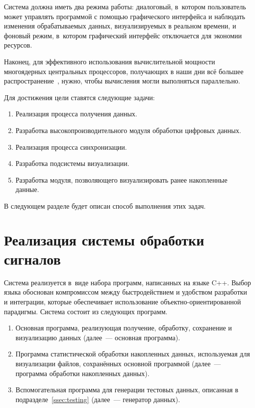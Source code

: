 \documentclass[a4paper, 14pt]{extarticle}
\begin{document}
  Система должна иметь два режима работы: диалоговый, в~котором пользователь может управлять
  программой с помощью графического интерфейса и наблюдать изменения обрабатываемых данных,
  визуализируемых в реальном времени, и фоновый режим, в~котором графический интерфейс отключается
  для экономии ресурсов.

  Наконец, для эффективного использования вычислительной мощности многоядерных центральных
  процессоров, получающих в наши дни всё большее распространение~\cite{steam-hardware}, нужно, чтобы
  вычисления могли выполняться параллельно.

  Для достижения цели ставятся следующие задачи:
  \begin{enumerate}
    \item Реализация процесса получения данных.
    \item Разработка высокопроизводительного модуля обработки цифровых данных.
    \item Реализация процесса синхронизации.
    \item Разработка подсистемы визуализации.
    \item Разработка модуля, позволяющего визуализировать ранее накопленные данные.
  \end{enumerate}

  В следующем разделе будет описан способ выполнения этих задач.

  \section{Реализация системы обработки сигналов}\label{sec:impl}

  Система реализуется в~виде набора программ, написанных на языке C++. Выбор языка обоснован
  компромиссом между быстродействием и удобством разработки и интеграции, которые обеспечивает
  использование объектно-ориентированной парадигмы. Система состоит из следующих программ.

  \begin{enumerate}
    \item Основная программа, реализующая получение, обработку, сохранение и визуализацию данных
      (далее~--- основная программа).
    \item Программа статистической обработки накопленных данных, используемая для визуализации
      файлов, сохранённых основной программой (далее~--- программа обработки накопленных данных).
    \item Вспомогательная программа для генерации тестовых данных, описанная в подразделе~\ref{ssec:testing}
      (далее~--- генератор данных).
  \end{enumerate}
\end{document}
